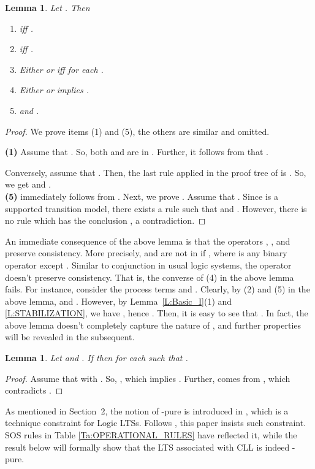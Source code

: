 \documentclass{elsarticle}
\theoremstyle{plain}
\newtheorem{lemma}[theorem]{Lemma}
\theoremstyle{definition}
\begin{document}
\begin{lemma}\label{L:F_NORMAL}
  Let . Then
  \begin{enumerate}
    \item   iff .
    \item  iff .
    \item Either  or  iff   for each .
    \item Either  or  implies .
    \item  and .
  \end{enumerate}
\end{lemma}
\begin{proof}
We prove items (1) and (5), the others are similar and omitted.

\noindent \textbf{(1)} Assume that . So, both  and  are in . Further, it follows from  that .

Conversely, assume that . Then, the last rule applied in the proof tree of  is . So, we get  and .\\

\noindent \textbf{(5)}  immediately follows from . Next, we prove . Assume that . Since  is a supported transition model, there exists a rule  such that  and . However, there is no rule which has the conclusion , a contradiction.
\end{proof}

An immediate consequence of the above lemma is that the operators , ,  and  preserve consistency. More precisely,  and  are not in  if , where  is any binary operator except . Similar to conjunction in usual logic systems, the operator  doesn't preserve consistency. That is, the converse of (4) in the above lemma fails. For instance, consider the process terms  and . Clearly, by (2) and (5) in the above lemma,  and .
However, by Lemma~\ref{L:Basic_I}(1) and \ref{L:STABILIZATION}, we have , hence .
Then, it is easy to see that .
In fact, the above lemma doesn't completely capture the nature of , and further properties will be revealed in the subsequent.

\begin{lemma}\label{L:CON_LLTS}
    Let  and . If  then
     for each  such that .
\end{lemma}
\begin{proof}
   Assume  that  with .
   So, , which implies . Further,  comes from , which contradicts .
\end{proof}

As mentioned in Section~2, the notion of -pure is introduced in \cite{Luttgen07, Luttgen10}, which is a technique constraint for Logic LTSs. Follows \cite{Luttgen07, Luttgen10}, this paper insists such constraint. SOS rules in Table \ref{Ta:OPERATIONAL_RULES} have reflected it, while the result below will formally show that the LTS associated with CLL is indeed -pure.
\end{document}
